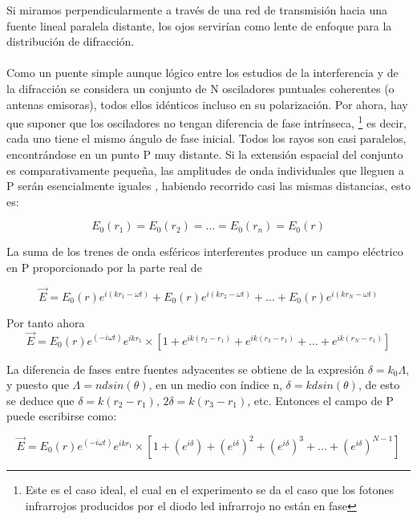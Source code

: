 \documentclass[12]{article}
\begin{document}
\begin{multicols}{2}
Si miramos perpendicularmente a través de una red de transmisión hacia una fuente lineal paralela distante, los ojos servirían como lente de enfoque para la distribución de difracción. \\ \\ 

Como un puente simple aunque lógico entre los estudios de la interferencia y de la difracción se considera un conjunto de N osciladores puntuales coherentes (o antenas emisoras), todos ellos idénticos incluso en su polarización. Por ahora, hay que suponer que los osciladores no tengan diferencia de fase intrínseca, \footnote{Este es el caso ideal, el cual en el experimento se da el caso que los fotones infrarrojos producidos por el diodo led infrarrojo no están en fase} es decir, cada uno tiene el mismo ángulo de fase inicial. Todos los rayos son casi paralelos, encontrándose en un punto P muy distante. Si la extensión espacial del conjunto es comparativamente pequeña, las amplitudes de onda individuales que lleguen a P serán esencialmente iguales , habiendo recorrido casi las mismas distancias, esto es:

\begin{equation}
E_{0}(r_{1}) = E_{0}(r_{2})= ... = E_{0}(r_{n}) = E_{0}(r)
\end{equation}

La suma de los trenes de onda esféricos interferentes   produce un campo eléctrico  en P proporcionado por la parte real de 

\begin{equation}
\vec{E} = E_{0}(r)e^{i(kr_{1} - \omega t)} +  E_{0}(r)e^{i(kr_{2} - \omega t)} + ... +  E_{0}(r)e^{i(kr_{N} - \omega t)}
\end{equation}

Por tanto ahora 
\begin{equation}
\vec{E} = E_{0}(r)e^{(-i\omega t)}e^{ikr_{1}}\times[1 + e^{ik(r_{2}-r_{1})} + e^{ik(r_{3}-r_{1})} + ... + e^{ik(r_{N}-r_{1})}]
\end{equation}

La diferencia de fases entre fuentes adyacentes se obtiene de la expresión $\delta = k_{0}\Lambda$, y puesto que $\Lambda = ndsin(\theta)$, en un medio con índice n, $\delta  = kdsin(\theta)$, de esto se deduce que $\delta = k(r_{2}-r_{1}) $, $2\delta = k(r_{3}-r_{1}) $, etc. Entonces el campo de P puede escribirse como:

\begin{equation}
\vec{E} = E_{0}(r)e^{(-i\omega t)}e^{ikr_{1}} \times[1 + (e^{i\delta}) +  (e^{i\delta})^{2} + (e^{i\delta})^{3} + ... + (e^{i\delta})^{N-1}]
\end{equation}


\end{multicols}
\end{document}
